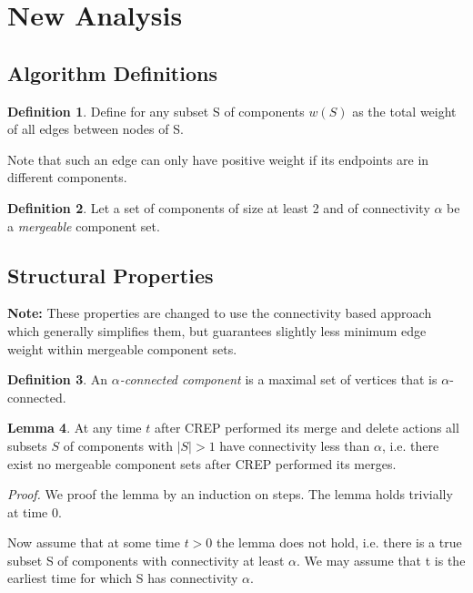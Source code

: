 \documentclass[xcolor=dvipsnames, tikz, 12pt]{article}
\newcommand{\crep}{C{\scriptsize REP}}
\theoremstyle{definition}
\newtheorem{defi}{Definition}
\newtheorem{lemma}[defi]{Lemma}
\begin{document}
	

\section{New Analysis}
\label{analysisSection}

\subsection{Algorithm Definitions}

\begin{defi}
	Define for any subset S of components $w(S)$ as the total weight of all edges between nodes of S.
\end{defi}

Note that such an edge can only have positive weight if its endpoints are in different components.

\begin{defi}
	Let a set of components of size at least 2 and of connectivity $\alpha$ be a \textit{mergeable} component set.	
\end{defi}


\subsection{Structural Properties}


\textbf{Note:} These properties are changed to use the connectivity based approach which generally simplifies them, but guarantees slightly less minimum edge weight within mergeable component sets.
\begin{defi}
	An $\alpha$\textit{-connected component} is a maximal set of vertices that is $\alpha$-connected.
\end{defi}

\begin{lemma}
	At any time $t$ after \crep{} performed its merge and delete actions all subsets $S$ of components with $|S|>1$ have connectivity less than $\alpha$, i.e. there exist no mergeable component sets after \crep{} performed its merges.
\end{lemma}

\textit{Proof.} We proof the lemma by an induction on steps. The lemma holds trivially at time 0.

Now assume that at some time $t>0$ the lemma does not hold, i.e. there is a true subset S of components with connectivity at least $\alpha$. We may assume that t is the earliest time for which S has connectivity $\alpha$.
\end{document}
